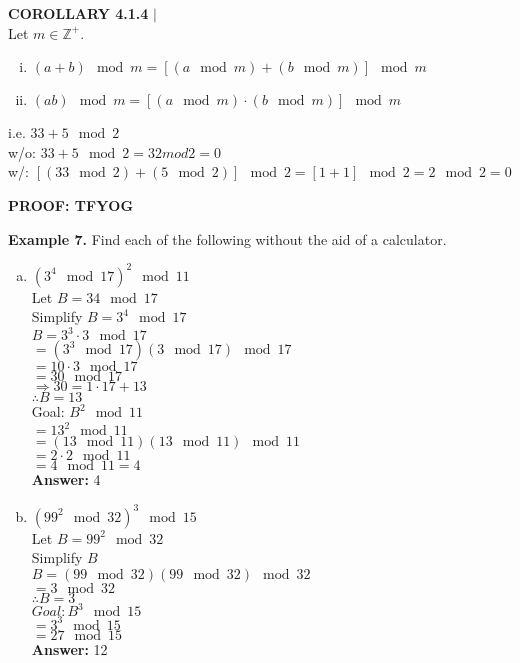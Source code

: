 \documentclass [12pt]{article}
\begin{document}
\begin{framed}
\textbf{COROLLARY 4.1.4} $|$ \\
\vspace{0.5cm}
Let $m \in \mathbb{Z}^{+}$. \\
\begin{enumerate}[(i)]
\item $(a+b)\mod m = [(a\mod m ) + (b\mod m)]\mod m$
\item $(ab)\mod m = [(a\mod m ) \cdot (b\mod m)]\mod m$
\end{enumerate}
i.e. $33 + 5 \mod 2$\\
w/o: $33 + 5 \mod 2 = 32 mod 2 = 0$\\
w/: $[(33 \mod 2)  + (5 \mod 2)]\mod 2 = [1 + 1] \mod 2 = 2 \mod 2 = 0$
\end{framed}
\vspace{0.5cm}
\textbf{PROOF: TFYOG}\\
\vspace{0.25in}
\raggedright
\textbf{Example 7.} Find each of the following without the aid of a calculator.
\begin{multicols}{2}
\begin{enumerate}[(a)]
\item $(3^4\mod 17)^{2}\mod 11$ \\
Let $B=34\mod 17$\\
Simplify $B = 3^4 \mod17$\\
\quad $B = 3^3 \cdot 3\mod 17$\\
\quad $= (3^3 \mod 17)(3\mod 17)\mod 17$\\
\quad $= 10\cdot 3 \mod 17$\\
\quad $= 30 \mod 17$\\
\quad\quad $\Rightarrow 30 = 1 \cdot 17 + 13$\\
$\therefore B = 13$\\
Goal: $B^2 \mod 11$\\
$= 13^2 \mod 11$\\
$= (13 \mod 11)(13 \mod 11)\mod 11$\\
$=2\cdot 2 \mod 11$\\
$=4 \mod 11 = 4$\\
\textbf{Answer: } 4

\columnbreak
\item $(99^2\mod 32)^3\mod 15$\\
Let $B=99^2 \mod 32$\\
Simplify $B$\\
\quad $B=(99 \mod32)(99\mod32)\mod32$\\
\quad $=3\mod32$\\
\quad $\therefore B=3$\\
$Goal: B^3\mod 15$\\
\quad $= 3^3 \mod 15$\\
\quad $= 27 \mod 15$\\
\quad \textbf{Answer:} 12
\end{enumerate}
\end{multicols}
\end{document}
